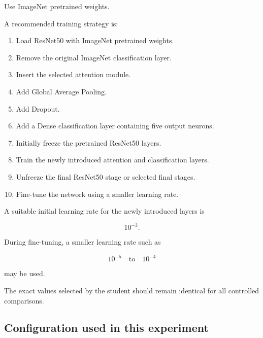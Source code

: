 \documentclass[10pt]{article}
\begin{document}
Use ImageNet pretrained weights.

A recommended training strategy is:

\begin{enumerate}

\item Load ResNet50 with ImageNet pretrained weights.

\item Remove the original ImageNet classification layer.

\item Insert the selected attention module.

\item Add Global Average Pooling.

\item Add Dropout.

\item Add a Dense classification layer containing five output neurons.

\item Initially freeze the pretrained ResNet50 layers.

\item Train the newly introduced attention and classification layers.

\item Unfreeze the final ResNet50 stage or selected final stages.

\item Fine-tune the network using a smaller learning rate.

\end{enumerate}

A suitable initial learning rate for the newly introduced layers is

\[
10^{-3}.
\]

During fine-tuning, a smaller learning rate such as

\[
10^{-5}
\quad\text{to}\quad
10^{-4}
\]

may be used.

The exact values selected by the student should remain identical for all
controlled comparisons.


\subsection*{Configuration used in this experiment}
\end{document}
